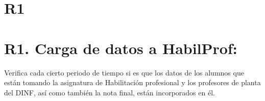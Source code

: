 

\section*{R1}

\newpage

\section*{R1. Carga de datos a HabilProf: }

Verifica cada cierto periodo de tiempo si es que los datos de los alumnos que están tomando la asignatura de Habilitación profesional y los profesores de planta del DINF, así como también la nota final, están incorporados en él.

\begin{itemize}
    \nombreAlumno{} %
    \rutAlumno{} %
    \nombreProfesor{} %
    \rutProfesor{} %
    \notaFinal{} %
    \fechaRegistroNota{} %
    \reqObli{} %
    \verDatos{} %
    \verNotaFinal{} %
\end{itemize}





